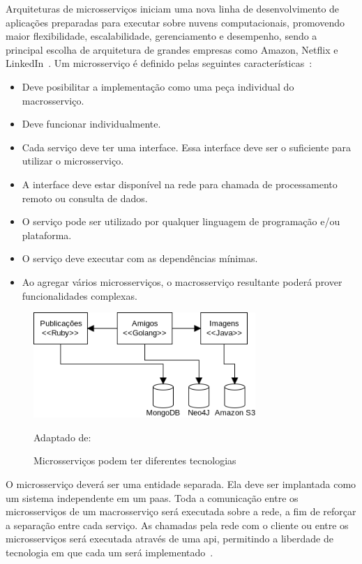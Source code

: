 Arquiteturas de microsserviços iniciam uma nova linha de desenvolvimento de aplicações preparadas para executar sobre nuvens computacionais, promovendo maior flexibilidade, escalabilidade, gerenciamento e desempenho, sendo a principal escolha de arquitetura de grandes empresas como Amazon, Netflix e LinkedIn~\cite{7830692,7515686}.
%
Um microsserviço é definido pelas seguintes características~\cite{8169955}:



\begin{itemize}
  \item Deve posibilitar a implementação como uma peça individual do macrosserviço.
  \item Deve funcionar individualmente.
  \item Cada serviço deve ter uma interface. Essa interface deve ser o suficiente para utilizar o microsserviço.
  \item A interface deve estar disponível na rede para chamada de processamento remoto ou consulta de dados.
  \item O serviço pode ser utilizado por qualquer linguagem de programação e/ou plataforma.
  \item O serviço deve executar com as dependências mínimas.
  \item Ao agregar vários microsserviços, o macrosserviço resultante poderá prover funcionalidades complexas.
\end{itemize}

\begin{figure}[htb!]
\caption{Microsserviços podem ter diferentes tecnologias}
\label{fig:microsservicos_tecnologias}
\includegraphics[height=4cm]{img/cap2/microsservicos_tecnologias.png}
\centering

Adaptado de:~\cite{Newman2015Feb}
\end{figure}

O microsserviço deverá ser uma entidade separada. Ela deve ser implantada como um sistema independente em um \ac{paas}.
%
Toda a comunicação entre os microsserviços de um macrosserviço será executada sobre a rede, a fim de reforçar a separação entre cada serviço.
%
As chamadas pela rede com o cliente ou entre os microsserviços será executada através de uma \ac{api}, permitindo a liberdade de tecnologia em que cada um será implementado~\cite{Newman2015Feb}.



